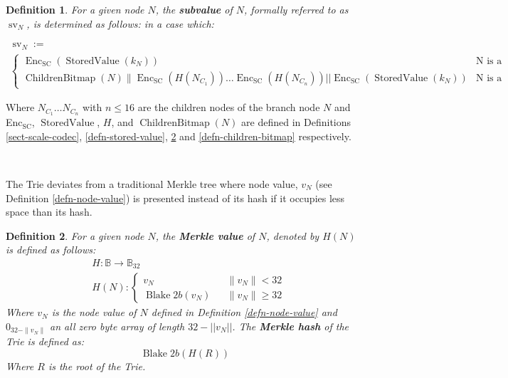 \documentclass{book}
\newcommand{\assign}{:=}
\newcommand{\nobracket}{}
\newcommand{\tmop}[1]{\ensuremath{\operatorname{#1}}}
\newcommand{\tmrsub}[1]{\ensuremath{_{\textrm{#1}}}}
\newcommand{\tmstrong}[1]{\textbf{#1}}
\newcommand{\tmverbatim}[1]{{\ttfamily{#1}}}
\newtheorem{definition}{Definition}
\newtheorem{definition}{Definition}
\begin{document}
\tmverbatim{}

\begin{definition}
  \label{defn-node-subvalue}For a given node $N$, the {\tmstrong{subvalue}} of
  $N$, formally referred to as $\tmop{sv}_N$, is determined as follows: in a
  case which:
  \begin{itemize}
    \[ \begin{array}{l}
         \tmop{sv}_N \assign\\
         \left\{ \begin{array}{cc}
           \tmop{Enc}_{\tmop{SC}} (\tmop{StoredValue} (k_N)) & \text{N is a
           leaf node}\\
           \nobracket \tmop{ChildrenBitmap} (N)\| \tmop{Enc}_{\tmop{SC}} (H
           (N_{C_1})) \ldots \tmop{Enc}_{\tmop{SC}} (H (N_{C_n})) | |
           \tmop{Enc}_{\tmop{SC}} (\tmop{StoredValue} (k_N))  & \text{N is a
           branch node}
         \end{array} \right.
       \end{array} \]
  \end{itemize}
\end{definition}

Where $N_{C_1} \ldots N_{C_n}$ with $n \leqslant 16$ are the children nodes of
the branch node $N$ and Enc\tmrsub{SC}, $\tmop{StoredValue}$, $H$, and
$\tmop{ChildrenBitmap} (N)$ are defined in Definitions \ref{sect-scale-codec},
\ref{defn-stored-value}, \ref{defn-merkle-value} and
\ref{defn-children-bitmap} respectively.

\

The Trie deviates from a traditional Merkle tree where node value, $v_N$ (see
Definition \ref{defn-node-value}) is presented instead of its hash if it
occupies less space than its hash.

\begin{definition}
  \label{defn-merkle-value}For a given node $N$, the {\tmstrong{Merkle value}}
  of $N$, denoted by $H (N)$ is defined as follows:
  \[ \begin{array}{ll}
       & H : \mathbb{B} \rightarrow \mathbb{B}_{32}\\
       & H (N) : \left\{ \begin{array}{lcl}
         v_N &  & \|v_N \|< 32\\
         \tmop{Blake} 2 b (v_N) &  & \|v_N \| \geqslant 32
       \end{array} \right.
     \end{array} \]
  Where $v_N$ is the node value of $N$ defined in Definition
  \ref{defn-node-value} and $0_{32 - \| v_N \|}$ an all zero byte array of
  length $32 - | | v_N | |$. The {\tmstrong{Merkle hash}} of the Trie is
  defined as:
  \[ \tmop{Blake} 2 b (H (R)) \]
  Where $R$ is the root of the Trie.
\end{definition}
\end{document}

